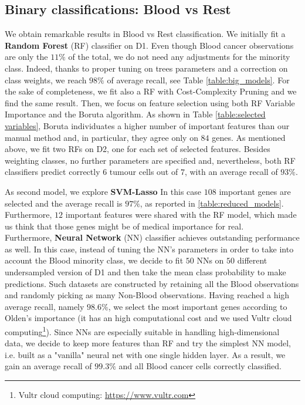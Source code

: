 \documentclass[a4paper,11pt, oneside]{article}  %
\begin{document}
\subsection{Binary classifications: Blood vs Rest}
We obtain remarkable results in Blood vs Rest classification.  We initially fit a \textbf{Random Forest} (RF) classifier on D1.  Even though Blood cancer observations are only the $11\%$ of the total,  we do not need any adjustments for the minority class.  Indeed,  thanks to proper tuning on trees parameters and a correction on class weights, we reach $98\%$ of average recall,  see Table \ref{table:big_models}. For the sake of completeness,  we fit also a RF with Cost-Complexity Pruning and we find the same result. Then,  we focus on feature selection using both RF Variable Importance and the Boruta algorithm.  As shown in Table \ref{table:selected variables},  Boruta individuates a higher number of important features than our manual method and,  in particular,  they agree only on $84$ genes.  As mentioned above,  we fit two RFs on D2,  one for each set of selected features.  Besides weighting classes, no further parameters are specified and,  nevertheless,  both RF classifiers predict correctly $6$ tumour cells out of $7$,  with an average recall of $93\%$.

As second model,  we explore \textbf{SVM-Lasso} In this case $108$ important genes are selected  and the average recall is $97\%$, as reported in \ref{table:reduced_models}.  Furthermore,  $12$ important features were shared with the RF model,  which made us think that those genes might be of medical importance for real.\\

Furthermore,  \textbf{Neural Network} (NN) classifier achieves outstanding performance as well.  In this case,  instead of tuning the NN's parameters in order to take into account the Blood minority class,  we decide to fit $50$ NNs on $50$ different undersampled version of D1 and then take the mean class probability to make predictions.  Such datasets are constructed by retaining all the Blood observations and randomly picking as many Non-Blood observations.  Having reached a high average recall,  namely $98.6\%$,  we select the most important genes according to Olden's importance (it has an high computational cost and we used Vultr cloud computing\footnote{Vultr cloud computing: \url{https://www.vultr.com}}). Since NNs are especially suitable in handling high-dimensional data, we decide to keep more features than RF and try the simplest NN model,  i.e.  built as a "vanilla" neural net with one single hidden layer.  As a result, we gain an average recall of $99.3\%$ and all Blood cancer cells correctly classified. 
\end{document}
